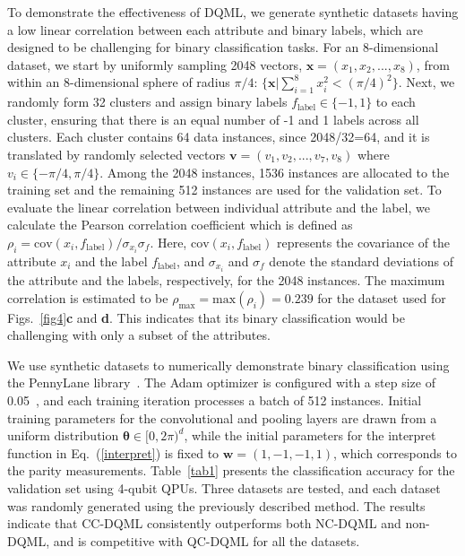 \documentclass[aps,prx,reprint,amsmath,amssymb,superscriptaddress,nobibnotes,showpacs]{revtex4-2}
\begin{document}
To demonstrate the effectiveness of DQML, we generate synthetic datasets having a low linear correlation between each attribute and binary labels, which are designed to be challenging for binary classification tasks. For an 8-dimensional dataset, we start by uniformly sampling 2048 vectors, $\boldsymbol{x}=(x_1, x_2, ..., x_8)$, from within an 8-dimensional sphere of radius $\pi/4$: $\{\boldsymbol{x}|\sum_{i=1}^8 x_i^2<(\pi/4)^2\}$. Next, we randomly form 32 clusters and assign binary labels $f_\mathrm{label}\in\{-1,1\}$ to each cluster, ensuring that there is an equal number of -1 and 1 labels across all clusters. Each cluster contains 64 data instances, since 2048/32=64, and it is translated by randomly selected vectors $\boldsymbol{v}=(v_1,v_2,...,v_7,v_8)$ where $v_i\in\{-\pi/4,\pi/4\}$. Among the 2048 instances, 1536 instances are allocated to the training set and the remaining 512 instances are used for the validation set. To evaluate the linear correlation between individual attribute and the label, we calculate the Pearson correlation coefficient which is defined as $\rho_i=\mathrm{cov}(x_i,f_\mathrm{label})/\sigma_{x_i}\sigma_{f}$. Here, $\mathrm{cov}(x_i,f_\mathrm{label})$ represents the covariance of the attribute $x_i$ and the label $f_\mathrm{label}$, and $\sigma_{x_i}$ and $\sigma_{f}$ denote the standard deviations of the attribute and the labels, respectively, for the 2048 instances. The maximum correlation is estimated to be $\rho_\mathrm{max}=\mathrm{max}( \rho_i)=0.239$ for the dataset used for Figs.~\ref{fig4}\textbf{c} and \textbf{d}. This indicates that its binary classification would be challenging with only a subset of the attributes.


We use synthetic datasets to numerically demonstrate binary classification using the PennyLane library~\cite{bergholm2018pennylane}. The Adam optimizer is configured with a step size of 0.05~\cite{kingma2014adam}, and each training iteration processes a batch of 512 instances. Initial training parameters for the convolutional and pooling layers are drawn from a uniform distribution $\boldsymbol{\theta} \in [0,2\pi)^d$, while the initial parameters for the interpret function in Eq.~(\ref{interpret}) is fixed to $\boldsymbol{w}=(1,-1,-1,1)$, which corresponds to the parity measurements.
Table~\ref{tab1} presents the classification accuracy for the validation set using 4-qubit QPUs. Three datasets are tested, and each dataset was randomly generated using the previously described method. The results indicate that CC-DQML consistently outperforms both NC-DQML and non-DQML, and is competitive with QC-DQML for all the datasets.
\end{document}
